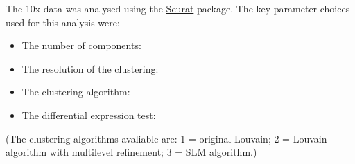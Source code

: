 The 10x data was analysed using the \href{http://satijalab.org/seurat/}{Seurat} package. The key parameter choices used for this analysis were:

\begin{itemize}
\item The number of \reductionType{} components: \nPCs
\item The resolution of the clustering: \resolution
\item The clustering algorithm: \clusteringAlgorithm
\item The differential expression test: \deTest
\end{itemize}

(The clustering algorithms avaliable are: 1 = original Louvain; 2 = Louvain algorithm with multilevel refinement; 3 = SLM algorithm.)
